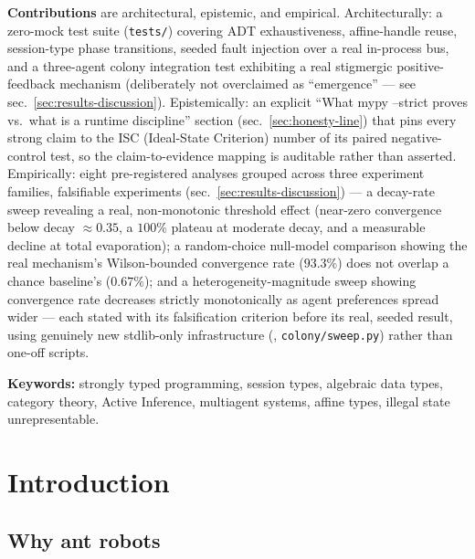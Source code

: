 \documentclass[
  english,
]{article}
\theoremstyle{definition}
\begin{document}
\textbf{Contributions} are architectural, epistemic, and empirical.
Architecturally: a zero-mock test suite (\texttt{tests/}) covering ADT
exhaustiveness, affine-handle reuse, session-type phase transitions,
seeded fault injection over a real in-process bus, and a three-agent
colony integration test exhibiting a real stigmergic positive-feedback
mechanism (deliberately not overclaimed as ``emergence'' --- see
sec.~\ref{sec:results-discussion}). Epistemically: an explicit ``What
mypy --strict proves vs.~what is a runtime discipline'' section
(sec.~\ref{sec:honesty-line}) that pins every strong claim to the ISC
(Ideal-State Criterion) number of its paired negative-control test, so
the claim-to-evidence mapping is auditable rather than asserted.
Empirically: eight pre-registered analyses grouped across three
experiment families, falsifiable experiments
(sec.~\ref{sec:results-discussion}) --- a decay-rate sweep revealing a
real, non-monotonic threshold effect (near-zero convergence below decay
\(\approx 0.35\), a \(100\%\) plateau at moderate decay, and a
measurable decline at total evaporation); a random-choice null-model
comparison showing the real mechanism's Wilson-bounded convergence rate
(\(93.3\%\)) does not overlap a chance baseline's (\(0.67\%\)); and a
heterogeneity-magnitude sweep showing convergence rate decreases
strictly monotonically as agent preferences spread wider --- each stated
with its falsification criterion before its real, seeded result, using
genuinely new stdlib-only infrastructure (,
\texttt{colony/sweep.py}) rather than one-off scripts.

\textbf{Keywords:} strongly typed programming, session types, algebraic
data types, category theory, Active Inference, multiagent systems,
affine types, illegal state unrepresentable.

\newpage

\section{Introduction}\label{sec:introduction}

\subsection{Why ant robots}\label{why-ant-robots}
\end{document}
